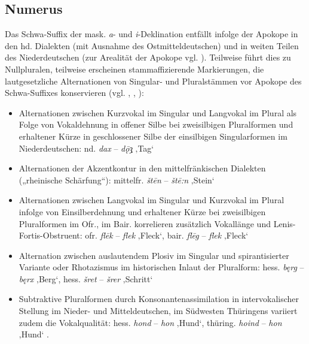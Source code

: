 \subsection{Numerus}
\label{sec:4.2.1}
Das Schwa-Suffix der mask. \textit{a}{}- und \textit{i}{}-Deklination entfällt infolge der Apokope in den hd. Dialekten (mit Ausnahme des Ostmitteldeutschen) und in weiten Teilen des Niederdeutschen (zur Arealität der Apokope vgl. \citealt[50--56]{Birkenes2014}). Teilweise führt dies zu Nullpluralen, teilweise erscheinen stammaffizierende Markierungen, die lautgesetzliche Alternationen von Singular- und Pluralstämmen vor Apokope des Schwa-Suffixes konservieren (vgl. \citealt[63--64]{Nübling2005}, \citealt[624--625]{Rabanus2019}, \citealt[183]{Seiler2008}):

\begin{itemize}
\item Alternationen zwischen Kurzvokal im Singular und Langvokal im Plural als Folge von Vokaldehnung in offener Silbe bei zweisilbigen Pluralformen und erhaltener Kürze in geschlossener Silbe der einsilbigen Singularformen im Niederdeutschen: nd. \textit{dax} -- \textit{dǭȝ̣} ‚Tag‘ \citep[187]{Schirmunski1962}
\item Alternationen der Akzentkontur in den mittelfränkischen Dialekten („rheinische Schärfung“): mittelfr. \textit{štēn} -- \textit{štē:n} ‚Stein‘ \citep[174]{Schirmunski1962}
\item Alternationen zwischen Langvokal im Singular und Kurzvokal im Plural infolge von Einsilberdehnung und erhaltener Kürze bei zweisilbigen Pluralformen im Ofr., im Bair. korrelieren zusätzlich Vokallänge und Lenis-Fortis-Obstruent: ofr. \textit{flēk} -- \textit{flek} ‚Fleck‘, bair. \textit{flēg} -- \textit{flek} ‚Fleck‘ \citep[417--418]{Schirmunski1962}
\item Alternation zwischen auslautendem Plosiv im Singular und spirantisierter Variante oder Rho\-tazismus im historischen Inlaut der Pluralform: hess. \textit{bęrg} -- \textit{bęrx} ‚Berg‘, hess. \textit{šret} -- \textit{šrer} ‚Schritt‘ \citep[1198]{Dingeldein1983}
\item Subtraktive Pluralformen durch Konsonantenassimilation in intervokalischer Stellung im Nieder- und Mitteldeutschen, im Südwesten Thüringens variiert zudem die Vokalqualität: hess. \textit{hond} -- \textit{hon} ‚Hund‘, thüring. \textit{hoind} -- \textit{hon} ‚Hund‘ \citep[417--418]{Schirmunski1962}.
\end{itemize}

